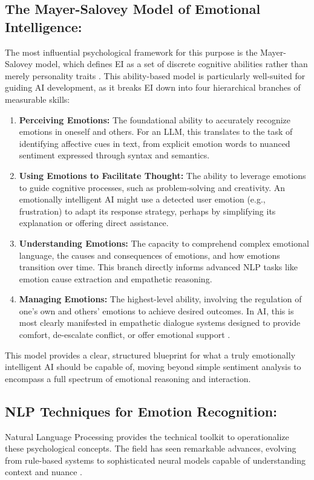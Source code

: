 \subsection{The Mayer-Salovey Model of Emotional Intelligence:} 
The most influential psychological framework for this purpose is the Mayer-Salovey model, which defines EI as a set of discrete cognitive abilities rather than merely personality traits \cite{salovey1990emotional, mayer1997what}. This ability-based model is particularly well-suited for guiding AI development, as it breaks EI down into four hierarchical branches of measurable skills:
\begin{enumerate}
    \item \textbf{Perceiving Emotions:} The foundational ability to accurately recognize emotions in oneself and others. For an LLM, this translates to the task of identifying affective cues in text, from explicit emotion words to nuanced sentiment expressed through syntax and semantics.
    \item \textbf{Using Emotions to Facilitate Thought:} The ability to leverage emotions to guide cognitive processes, such as problem-solving and creativity. An emotionally intelligent AI might use a detected user emotion (e.g., frustration) to adapt its response strategy, perhaps by simplifying its explanation or offering direct assistance.
    \item \textbf{Understanding Emotions:} The capacity to comprehend complex emotional language, the causes and consequences of emotions, and how emotions transition over time. This branch directly informs advanced NLP tasks like emotion cause extraction \cite{huang2023emotioncause} and empathetic reasoning.
    \item \textbf{Managing Emotions:} The highest-level ability, involving the regulation of one's own and others' emotions to achieve desired outcomes. In AI, this is most clearly manifested in empathetic dialogue systems designed to provide comfort, de-escalate conflict, or offer emotional support \cite{rashkin2019empathetic}.
\end{enumerate}
This model provides a clear, structured blueprint for what a truly emotionally intelligent AI should be capable of, moving beyond simple sentiment analysis to encompass a full spectrum of emotional reasoning and interaction.

\subsection{NLP Techniques for Emotion Recognition:} 
Natural Language Processing provides the technical toolkit to operationalize these psychological concepts. The field has seen remarkable advances, evolving from rule-based systems to sophisticated neural models capable of understanding context and nuance \cite{hirschberg2015advances}.

